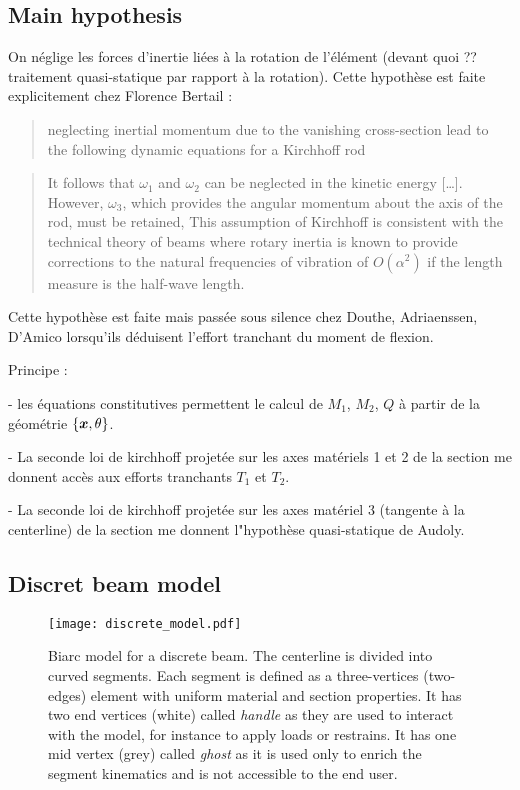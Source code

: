 \subsection{Main hypothesis}

On néglige les forces d'inertie liées à la rotation de l'élément  (devant quoi ?? traitement quasi-statique par rapport à la rotation). Cette hypothèse est faite explicitement chez Florence Bertail :

\blockcquote[]{Casati2013}{neglecting inertial momentum due to the vanishing cross-section lead to the following dynamic equations for a Kirchhoff rod}
\blockcquote[p. 17]{Dill1992}{It follows that $\omega_1$ and $\omega_2$ can be neglected in the kinetic energy [\ldots]. However, $\omega_3$, which provides the angular momentum about the axis of the rod, must be retained, This assumption of Kirchhoff is consistent with the technical theory of beams where rotary inertia is known to provide corrections to the natural frequencies of vibration of $O(\alpha^2)$ if the length measure is the half-wave length.}


Cette hypothèse est faite mais passée sous silence chez Douthe, Adriaenssen, D'Amico lorsqu'ils déduisent l'effort tranchant du moment de flexion.

Principe :

- les équations constitutives permettent le calcul de $M_1$, $M_2$, $Q$ à partir de la géométrie $\{\boldsymbol{x},\theta\}$.

- La seconde loi de kirchhoff projetée sur les axes matériels 1 et 2 de la section me donnent accès aux efforts tranchants $T_1$ et $T_2$.

- La seconde loi de kirchhoff projetée sur les axes matériel 3 (tangente à la centerline) de la section me donnent l"hypothèse quasi-statique de Audoly.


\subsection{Discret beam model}

\begin{figure}[t]
	\centering
	\texttt{[image: discrete\_model.pdf]}
	\caption{Biarc model for a discrete beam. The centerline is divided into curved segments. Each segment is defined as a three-vertices (two-edges) element with uniform material and section properties. It has two end vertices (white) called \emph{handle} as they are used to interact with the model, for instance to apply loads or restrains. It has one mid vertex (grey) called \emph{ghost} as it is used only to enrich the segment kinematics and is not accessible to the end user.}
	\label{fig:5}
\end{figure} 

